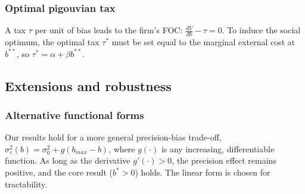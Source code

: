 \subsubsection{Optimal pigouvian tax}
A tax $\tau$ per unit of bias leads to the firm's FOC: $\frac{dV}{db} - \tau = 0$. To induce the social optimum, the optimal tax $\tau^*$ must be set equal to the marginal external cost at $b^{**}$, so $\tau^* = \alpha + \beta b^{**}$.

\subsection{Extensions and robustness}

\subsubsection{Alternative functional forms}
Our results hold for a more general precision-bias trade-off, $\sigma_\varepsilon^2(b) = \sigma_0^2 + g(b_{max} - b)$, where $g(\cdot)$ is any increasing, differentiable function. As long as the derivative $g'(\cdot)>0$, the precision effect remains positive, and the core result ($b^*>0$) holds. The linear form is chosen for tractability.